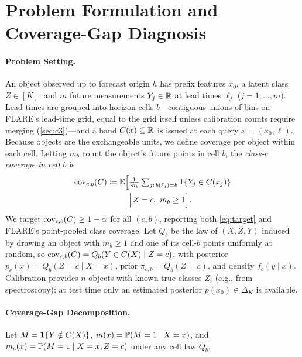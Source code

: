 \section{Problem Formulation and Coverage-Gap Diagnosis}
\label{sec:setup}

\paragraph{Problem Setting.}
An object observed up to forecast origin $h$ has prefix features $x_0$, a latent class $Z\in[K]$, and $m$ future measurements $Y_j\in\R$ at lead times $\ell_j$ ($j=1,\dots,m$).
Lead times are grouped into horizon cells $b$---contiguous unions of bins on FLARE's lead-time grid, equal to the grid itself unless calibration counts require merging (\cref{sec:c3})---and a band $C(x)\subseteq\R$ is issued at each query $x=(x_0,\ell)$.
Because objects are the exchangeable units, we define coverage per object within each cell.
Letting $m_b$ count the object's future points in cell $b$, the \emph{class-$c$ coverage in cell $b$} is
\begin{equation}
\label{eq:target}
\begin{split}
\cov_{c,b}(C) \coloneqq \E\Big[&\tfrac{1}{m_b}\textstyle\sum_{j:\,b(\ell_j)=b}\one\{Y_j\in C(x_j)\}\\
&\Big|\, Z=c,\ m_b\ge1\Big].
\end{split}
\end{equation}
We target $\cov_{c,b}(C)\ge 1-\alpha$ for all $(c,b)$, reporting both \cref{eq:target} and FLARE's point-pooled class coverage.
Let $Q_b$ be the law of $(X,Z,Y)$ induced by drawing an object with $m_b\ge1$ and one of its cell-$b$ points uniformly at random, so $\cov_{c,b}(C)=Q_b(Y\in C(X)\mid Z=c)$, with posterior $p_c(x)=Q_b(Z=c\mid X=x)$, prior $\pi_{c,b}=Q_b(Z=c)$, and density $f_c(y\mid x)$.
Calibration provides $n$ objects with known true classes $Z_i$ (e.g., from spectroscopy); at test time only an estimated posterior $\hat p(x_0)\in\Delta_K$ is available.

\paragraph{Coverage-Gap Decomposition.}
Let $M=\one\{Y\notin C(X)\}$, $m(x)=\P(M=1\mid X=x)$, and $m_c(x)=\P(M=1\mid X=x,Z=c)$ under any cell law $Q_b$.

